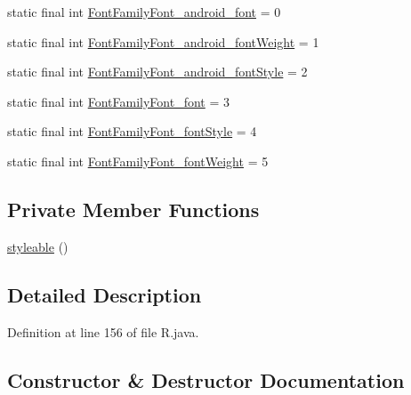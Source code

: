 \begin{DoxyCompactItemize}
\item 
static final int \mbox{\hyperlink{classandroid_1_1support_1_1fragment_1_1_r_1_1styleable_af95e64ae4e8dad591dedf7b07c93a196}{Font\+Family\+Font\+\_\+android\+\_\+font}} = 0
\item 
static final int \mbox{\hyperlink{classandroid_1_1support_1_1fragment_1_1_r_1_1styleable_a75f031bcf28607be01327d33c0d0f68b}{Font\+Family\+Font\+\_\+android\+\_\+font\+Weight}} = 1
\item 
static final int \mbox{\hyperlink{classandroid_1_1support_1_1fragment_1_1_r_1_1styleable_ab9df9a98a2929594f4dc77c37e57bc48}{Font\+Family\+Font\+\_\+android\+\_\+font\+Style}} = 2
\item 
static final int \mbox{\hyperlink{classandroid_1_1support_1_1fragment_1_1_r_1_1styleable_a519398e96e67e402ee501e3cc0f0fc54}{Font\+Family\+Font\+\_\+font}} = 3
\item 
static final int \mbox{\hyperlink{classandroid_1_1support_1_1fragment_1_1_r_1_1styleable_af95cbf52f566f94888d1a44ec8f46fd5}{Font\+Family\+Font\+\_\+font\+Style}} = 4
\item 
static final int \mbox{\hyperlink{classandroid_1_1support_1_1fragment_1_1_r_1_1styleable_a8af402b9cdd397b2b12747e94e2e362c}{Font\+Family\+Font\+\_\+font\+Weight}} = 5
\end{DoxyCompactItemize}
\subsection*{Private Member Functions}
\begin{DoxyCompactItemize}
\item 
\mbox{\hyperlink{classandroid_1_1support_1_1fragment_1_1_r_1_1styleable_a32a524685d3892640a9dec6563fbbbc0}{styleable}} ()
\end{DoxyCompactItemize}


\subsection{Detailed Description}


Definition at line 156 of file R.\+java.



\subsection{Constructor \& Destructor Documentation}
\mbox{\label{classandroid_1_1support_1_1fragment_1_1_r_1_1styleable_a32a524685d3892640a9dec6563fbbbc0}} 

